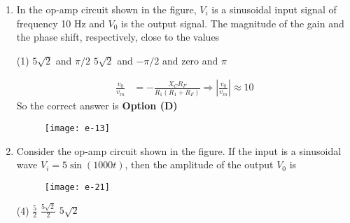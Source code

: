 \begin{enumerate}
\begin{figure}[H]
		\centering
		\texttt{[image: e-08]}
	\end{figure}
	\begin{tasks}(4)
		\task[\textbf{A.}] $-0.33 \mathrm{~V}$
		\task[\textbf{B.}] $-0.50 \mathrm{~V}$
		\task[\textbf{C.}] $-1.00 \mathrm{~V}$
		\task[\textbf{D.}] $-0.25 \mathrm{~V}$
	\end{tasks}
\begin{answer}
	\begin{align*}
	V_{0}&=-\frac{R_{F} V_{i n}}{R_{1}}=-\frac{1}{2} V=-0.05\\\text{ where }R_{F}&=\frac{1 \times 1}{1+1}=\frac{1}{2} K and R_{1}=1 K
	\end{align*}
	So the correct answer is \textbf{Option (B)}
\end{answer}
	\item In the op-amp circuit shown in the figure, $V_{i}$ is a sinusoidal input signal of frequency 10 $\mathrm{Hz}$ and $V_{0}$ is the output signal. The magnitude of the gain and the phase shift, respectively, close to the values
	{	}
		\begin{tasks}(1)
			\task[\textbf{A.}] $5 \sqrt{2}$ and $\pi / 2$
			\task[\textbf{B.}] $5 \sqrt{2}$ and $-\pi / 2$
			 and zero
			 and $\pi$
		\end{tasks}
	\begin{answer}
		\begin{align*}
		\frac{v_{0}}{v_{i n}}
		&=-\frac{X_{C} R_{F}}{R_{1}\left(R_{1}+R_{F}\right)} \Rightarrow\left|\frac{v_{0}}{v_{i n}}\right| \approx 10
		\end{align*}
		So the correct answer is \textbf{Option (D)}
	\end{answer}
		\begin{figure}[H]
			\centering
			\texttt{[image: e-13]}
		\end{figure}
	\item Consider the op-amp circuit shown in the figure.
	If the input is a sinusoidal wave $V_{i}=5 \sin (1000 t)$, then the amplitude of the output $V_{0}$ is
	{	\exyear{NET/JRF(DEC-2013)}}
	\begin{figure}[H]
		\centering
		\texttt{[image: e-21]}
	\end{figure}
	\begin{tasks}(4)
		\task[\textbf{A.}] $\frac{5}{2}$
		\task[\textbf{B.}]  5
		\task[\textbf{C.}] $\frac{5 \sqrt{2}}{2}$
		\task[\textbf{D.}] $5 \sqrt{2}$
	\end{tasks}

\end{enumerate}
